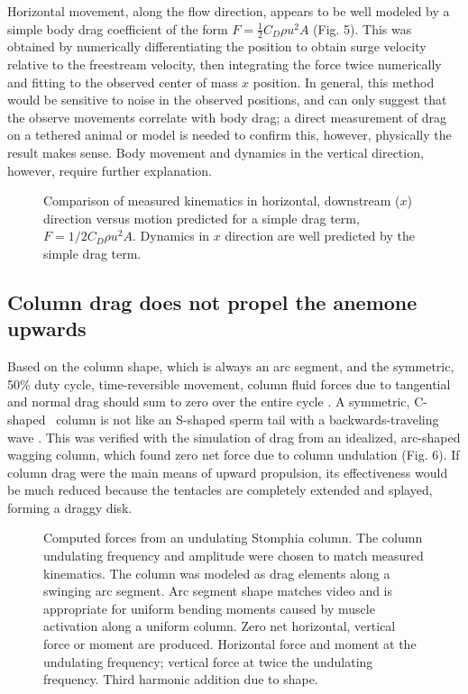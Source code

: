 \documentclass{jeb}
\newcommand{\Stomphia}{\Genus{S. coccinea}}
\begin{document}
Horizontal movement, along the flow direction, appears to be well modeled by a simple body drag coefficient of the form $F=\frac{1}{2} C_D \rho u^2 A$ (Fig. 5). This was obtained by numerically differentiating the position to obtain surge velocity relative to the freestream velocity, then integrating the force twice numerically and fitting to the observed center of mass $x$ position.  In general, this method would be sensitive to noise in the observed positions, and can only suggest that the observe movements correlate with body drag; a direct measurement of drag on a tethered animal or model is needed to confirm this, however, physically the result makes sense.  Body movement and dynamics in the vertical direction, however, require further explanation. 

\begin{figure}
\caption{Comparison of measured kinematics in horizontal, downstream ($x$) direction versus motion predicted for a simple drag term, $F=1/2C_D\rho u^2 A$.  Dynamics in $x$ direction are well predicted by the simple drag term.}
\label{fig:5}
\end{figure}

\subsection{Column drag does not propel the anemone upwards}
	Based on the column shape, which is always an arc segment, and the symmetric, 50\% duty cycle, time-reversible movement, column fluid forces due to tangential and normal drag should sum to zero over the entire cycle \citep{Purcell:1977}.  A symmetric, C-shaped \Stomphia\ column is not like an S-shaped sperm tail with a backwards-traveling wave \citep{Gray:1955}.  This was verified with the simulation of drag from an idealized, arc-shaped wagging column, which found zero net force due to column undulation (Fig. 6).    If column drag were the main means of upward propulsion, its effectiveness would be much reduced because the tentacles are completely extended and splayed, forming a draggy disk.    

\begin{figure}
\caption{Computed forces from an undulating Stomphia column.  The column undulating frequency and 
amplitude were chosen to match measured kinematics.  The column was modeled as drag elements 
along a swinging arc segment.  Arc segment shape matches video and is appropriate for uniform bending moments caused by muscle activation along a uniform column.  Zero net horizontal, vertical force or moment are produced.  Horizontal force and moment at the undulating frequency; vertical force at twice the undulating frequency.  Third harmonic addition due to shape.}
\label{fig:6}
\end{figure}
\end{document}
